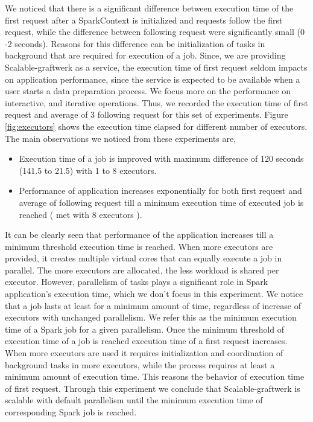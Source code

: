 We noticed that there is a significant difference between execution time of the first request after a SparkContext is initialized and requests follow the first request, while the difference between following request were significantly small (0 -2 seconds). Reasons for this difference can be initialization of tasks in background that are required for execution of a job. Since, we are providing Scalable-graftwerk as a service, the execution time of first request seldom impacts on application performance, since the service is expected to be available when a user starts a data preparation process. We focus more on the performance on interactive, and iterative operations. Thus, we recorded the execution time of first request and average of 3 following request for this set of experiments. Figure \ref{fig:executors} shows the execution time elapsed for different number of executors. The main observations we noticed from these experiments are, 
\begin{itemize}
\item Execution time of a job is improved with maximum difference of 120 seconds (141.5 to 21.5) with 1 to 8 executors. 
\item Performance of application increases exponentially for both first request and average of following request till a minimum execution time of executed job is reached ( met with 8 executors ).  
\end{itemize}
It can be clearly seen that performance of the application increases till a minimum threshold execution time is reached. When more executors are provided, it creates multiple virtual cores that can equally execute a job in parallel. The more executors are allocated, the less workload is shared per executor. However, parallelism of tasks plays a significant role in Spark application's execution time, which we don't focus in this experiment. We notice that a job lasts at least for a minimum amount of time, regardless of increase of executors with unchanged parallelism. We refer this as the minimum execution time of a Spark job for a given parallelism. Once the minimum threshold of execution time of a job is reached execution time of a first request increases. When more executors are used it requires initialization and coordination of background tasks in more executors, while the process requires at least a minimum amount of execution time. This reasons the behavior of execution time of first request. Through this experiment we conclude that Scalable-graftwerk is scalable with default parallelism until the minimum execution time of corresponding Spark job is reached. 
 
